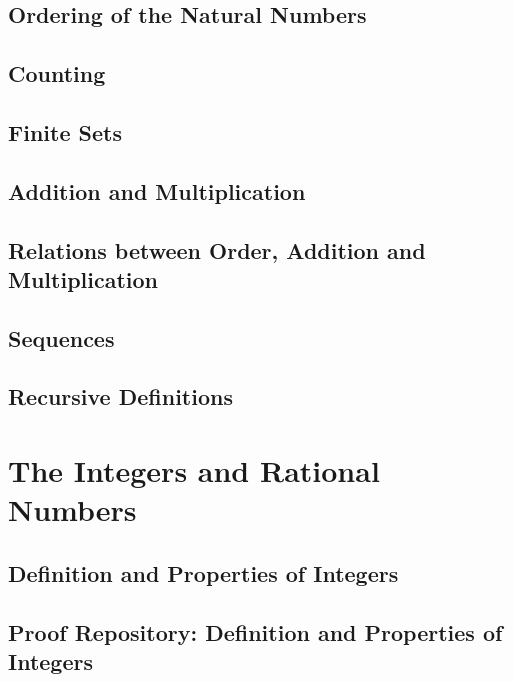 \documentclass{book}
\theoremstyle{definition}
\theoremstyle{remark}
\begin{document}
\subsection{Ordering of the Natural Numbers}
\subsection{Counting}
\subsection{Finite Sets}
\subsection{Addition and Multiplication}
\subsection{Relations between Order, Addition and Multiplication}
\subsection{Sequences}
\subsection{Recursive Definitions}

\newpage
\section{The Integers and Rational Numbers}

\subsection{Definition and Properties of Integers}
\newpage
\subsection{Proof Repository: Definition and Properties of Integers} 
\end{document}
